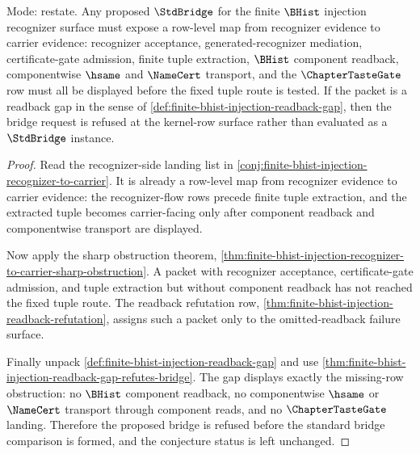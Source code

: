 \begin{theorem}
\label{thm:finite-bhist-injection-open-kernel-sharp-restatement}
Mode: restate. Any proposed $\StdBridge$ for the finite $\BHist$ injection recognizer surface must expose a row-level map from recognizer evidence to carrier evidence: recognizer acceptance, generated-recognizer mediation, certificate-gate admission, finite tuple extraction, $\BHist$ component readback, componentwise $\hsame$ and $\NameCert$ transport, and the $\ChapterTasteGate$ row must all be displayed before the fixed tuple route is tested. If the packet is a readback gap in the sense of \autoref{def:finite-bhist-injection-readback-gap}, then the bridge request is refused at the kernel-row surface rather than evaluated as a $\StdBridge$ instance.
\end{theorem}
\begin{proof}
Read the recognizer-side landing list in \autoref{conj:finite-bhist-injection-recognizer-to-carrier}. It is already a row-level map from recognizer evidence to carrier evidence: the recognizer-flow rows precede finite tuple extraction, and the extracted tuple becomes carrier-facing only after component readback and componentwise transport are displayed.

Now apply the sharp obstruction theorem, \autoref{thm:finite-bhist-injection-recognizer-to-carrier-sharp-obstruction}. A packet with recognizer acceptance, certificate-gate admission, and tuple extraction but without component readback has not reached the fixed tuple route. The readback refutation row, \autoref{thm:finite-bhist-injection-readback-refutation}, assigns such a packet only to the omitted-readback failure surface.

Finally unpack \autoref{def:finite-bhist-injection-readback-gap} and use \autoref{thm:finite-bhist-injection-readback-gap-refutes-bridge}. The gap displays exactly the missing-row obstruction: no $\BHist$ component readback, no componentwise $\hsame$ or $\NameCert$ transport through component reads, and no $\ChapterTasteGate$ landing. Therefore the proposed bridge is refused before the standard bridge comparison is formed, and the conjecture status is left unchanged.
\end{proof}

